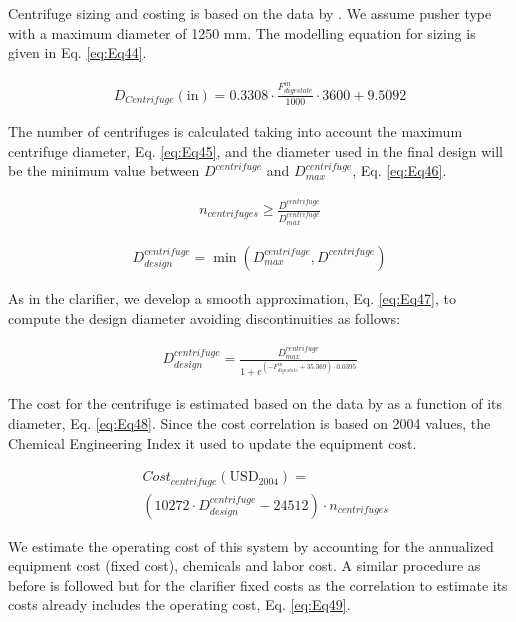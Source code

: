 \begin{refsection}[referencesCh2]
Centrifuge sizing and costing is based on the data by \citet{green2008perry}. We assume pusher type with a maximum diameter of 1250 mm. The modelling equation for sizing is given in Eq. \ref{eq:Eq44}.

\begin{align}
	D_{Centrifuge}\left( \text{in} \right) = 0.3308 \cdot \frac{F_{digestate}^{in}}{1000}\cdot 3600 + 9.5092 \label{eq:Eq44}
\end{align}

The number of centrifuges is calculated taking into account the maximum centrifuge diameter, Eq. \ref{eq:Eq45}, and the diameter used in the final design will be the minimum value between $D^{centrifuge}$ and $D_{max}^{centrifuge}$, Eq. \ref{eq:Eq46}.

\begin{align}
	{n}_{centrifuges} \ge \frac{D^{centrifuge}}{D_{max}^{centrifuge}} \label{eq:Eq45}
\end{align}

\begin{align}
	D_{design}^{centrifuge} = \min \left( {D_{max}^{centrifuge}, D^{centrifuge}} \right) \label{eq:Eq46}
\end{align}

As in the clarifier, we develop a smooth approximation, Eq. \ref{eq:Eq47}, to compute the design diameter avoiding discontinuities as follows:

\begin{align}
	D_{design}^{centrifuge} = \frac{D_{max}^{centrifuge}}{1 + {e^{\left( { -F_{digestate}^{in} + 35.369} \right) \cdot 0.0395}}} \label{eq:Eq47}
\end{align}

The cost for the centrifuge is estimated based on the data by \citet{green2008perry} as a function of its diameter, Eq. \ref{eq:Eq48}. Since the cost correlation is based on 2004 values, the Chemical Engineering Index it used to update the equipment cost.

\begin{align}
	& Cost_{centrifuge}\left( \text{USD}_{2004}  \right) = \label{eq:Eq48} \\
	& \left( {10272 \cdot D_{design}^{centrifuge} - 24512} \right) \cdot {n}_{centrifuges} \nonumber
\end{align}

We estimate the operating cost of this system by accounting for the annualized equipment cost (fixed cost), chemicals and labor cost. A similar procedure as before is followed \citep{vian1975pronostico} but for the clarifier fixed costs as the correlation to estimate its costs already includes the operating cost, Eq. \ref{eq:Eq49}.


\end{refsection}
